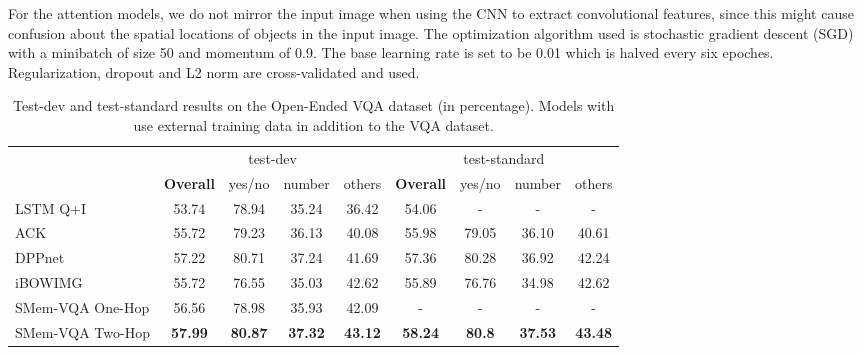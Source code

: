For the attention models, we do not mirror the input image when using the CNN to extract convolutional features, since this might cause confusion about the spatial locations of objects in the input image.
The optimization algorithm used is stochastic gradient descent (SGD) with a minibatch of size 50 and momentum of 0.9.
The base learning rate is set to be 0.01 which is halved every six epoches. Regularization, dropout and L2 norm are cross-validated and used. 


\begin{table}[!t]
\centering
\caption{Test-dev and test-standard results on the Open-Ended VQA dataset (in percentage). Models with  use external training data in addition to the VQA dataset.}
\scriptsize
 \begin{tabular}{l || c c c c || c c c c} 
 \hline
 ~ & \multicolumn{4}{c||}{test-dev}  & \multicolumn{4}{c}{test-standard}\\ 
 ~ & \bf{Overall}  & yes/no  & number  & others & \bf{Overall}  & yes/no  & number  & others\\ \hline
 LSTM Q+I~\cite{DBLP:journals/corr/AntolALMBZP15} & 53.74 & 78.94  & 35.24  & 36.42 & 54.06 & -  & -  & -\\ ACK~\cite{wu2015ask} & 55.72 & 79.23  & 36.13  & 40.08 & 55.98 & 79.05  & 36.10  & 40.61\\ DPPnet~\cite{noh2015image} & 57.22 & 80.71  & 37.24  & 41.69 & 57.36 & 80.28  & 36.92  & 42.24\\ iBOWIMG~\cite{zhou2015simple} & 55.72 & 76.55  & 35.03  & 42.62 & 55.89 & 76.76  & 34.98  & 42.62\\ \hline 
 SMem-VQA One-Hop & 56.56 & 78.98 & 35.93  & 42.09 & - & -  & -  & -\\ SMem-VQA Two-Hop & \textbf{57.99} & \textbf{80.87}  & \textbf{37.32}  & \textbf{43.12} & \textbf{58.24} & \textbf{80.8}  & \textbf{37.53}  & \textbf{43.48}\\ \hline 
 \end{tabular}
\label{fig:baseline2}
\vspace{-0.15in}
\end{table}

